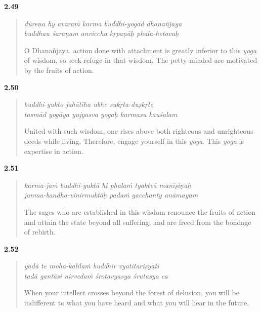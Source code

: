\par\noindent\textbf{2.49}\par
\begin{verse}
\textit{dūreṇa hy avaraṁ karma buddhi-yogād dhanañjaya} \\
\textit{buddhau śaraṇam anviccha kṛpaṇāḥ phala-hetavaḥ}

\noindent O Dhanañjaya, action done with attachment is greatly inferior to this \textit{yoga} of wisdom, so seek refuge in that wisdom. The petty-minded are motivated by the fruits of action.
\end{verse}
\par



\par\noindent\textbf{2.50}\par
\begin{verse}
\textit{buddhi-yukto jahātīha ubhe sukṛta-duṣkṛte} \\
\textit{tasmād yogāya yujyasva yogaḥ karmasu kauśalam}

\noindent United with such wisdom, one rises above both righteous and unrighteous deeds while living. Therefore, engage yourself in this \textit{yoga}. This \textit{yoga} is expertise in action.
\end{verse}
\par



\par\noindent\textbf{2.51}\par
\begin{verse}
\textit{karma-jaṁ buddhi-yuktā hi phalaṁ tyaktvā manīṣiṇaḥ} \\
\textit{janma-bandha-vinirmuktāḥ padaṁ gacchanty anāmayam}

\noindent The sages who are established in this wisdom renounce the fruits of action and attain the state beyond all suffering, and are freed from the bondage of rebirth.
\end{verse}
\par



\par\noindent\textbf{2.52}\par
\begin{verse}
\textit{yadā te moha-kalilaṁ buddhir vyatitariṣyati} \\
\textit{tadā gantāsi nirvedaṁ śrotavyasya śrutasya ca}

\noindent When your intellect crosses beyond the forest of delusion, you will be indifferent to what you have heard and what you will hear in the future.
\end{verse}
\par



